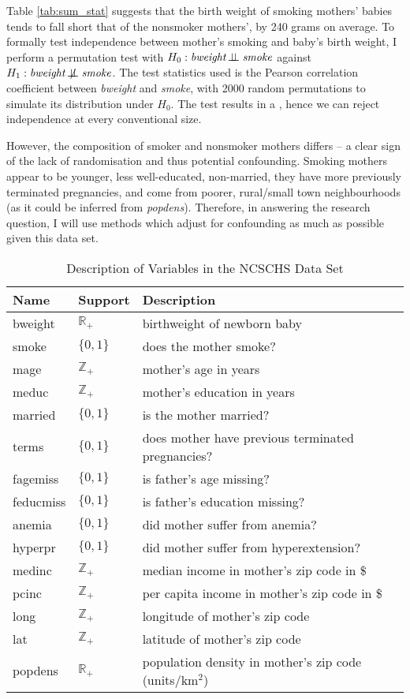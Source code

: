 \documentclass[a4paper,12pt]{article}
\newcommand{\indep}{\rotatebox[origin=c]{90}{$\models$}}
\renewcommand{\indep}{\!\perp\!\!\!\perp}
\newcommand{\notindep}{\not\!\perp\!\!\!\perp}
\newcommand{\posreal}{\mathbb{R}_+}
\newcommand{\posint}{\mathbb{Z}_+}
\newcommand{\dummy}{\{0,1\}}
\begin{document}
\noindent Table \ref{tab:sum_stat} suggests that the birth weight of smoking mothers' babies tends to fall short that of the nonsmoker mothers', by 240 grams on average. To formally test independence between mother's smoking and baby's birth weight, I perform a permutation test with $H_0: \text{\textit{bweight}}\indep\text{\textit{smoke}}$ against $H_1: \text{\textit{bweight}}\notindep\text{\textit{smoke}}$.  The test statistics used is the Pearson correlation coefficient  between \textit{bweight} and \textit{smoke}, with 2000  random permutations to simulate its distribution under $H_0$.
The test results in a ,
hence we can reject independence at every conventional size. 

\noindent However, the composition of smoker and nonsmoker mothers differs -- a clear sign of the lack of randomisation and thus potential confounding. Smoking mothers appear to be younger, less well-educated, non-married, they have more previously terminated pregnancies, and come from poorer, rural/small town neighbourhoods (as it could be inferred from \textit{popdens}). Therefore, in answering the research question, I will use methods which adjust for confounding as much as possible given this data set.


\begin{table}[h!]
\centering
\caption{Description of Variables in the NCSCHS Data Set}
\label{tab:data_des}
\begin{tabular}{lll}
Name & Support & Description \\ \hline\hline
bweight &  $\posreal$& birthweight of newborn baby \\
smoke & $\dummy$ &does the mother smoke? \\ \hline
mage & $\posint$ & mother's age in years \\
meduc & $\posint$ & mother's education in years \\
married &$\dummy$&is the mother married? \\
terms & $\dummy$ & does mother have previous terminated pregnancies? \\
fagemiss & $\dummy$ & is father's age missing? \\
feducmiss &$\dummy$& is father's education missing? \\
anemia & $\dummy$& did mother suffer from anemia? \\
hyperpr &$\dummy$& did mother suffer from hyperextension? \\
medinc &$\posint$& median income in mother's zip code in \$ \\
pcinc &$\posint$& per capita income in mother's zip code  in \$ \\
long & $\posint$& longitude of mother's zip code \\
lat &$\posint$& latitude of mother's zip code \\
popdens &$\posreal$& population density in mother's  zip code (units/km$^2$)\\ \hline
\end{tabular}
\end{table}
\end{document}
